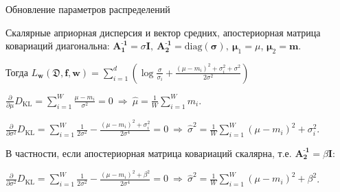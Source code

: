 \documentclass{beamer}
\newcommand{\DD}{{\mathfrak{D}}}
\newcommand{\bw}{{\textbf{w}}}
\newcommand{\II}{{\textbf{I}}}
\newcommand{\bbf}{{\textbf{f}}}
\newcommand{\bm}{{\textbf{m}}}
\newcommand{\bs}{{\boldsymbol{\sigma}}}
\newcommand{\bAo}{\mathbf{A^\text{-1}_\text{1}}}
\newcommand{\bAt}{\mathbf{A^\text{-1}_\text{2}}}
\newcommand{\bmuo}{{\boldsymbol{\mu}_1}}
\newcommand{\bmut}{{\boldsymbol{\mu}_2}}
\newcommand{\DKL}{\mathit{D}_{\text{KL}}}
\begin{document}
%
%
%
%
%
%
%

\begin{frame}{Обновление параметров распределений}

Скалярные априорная дисперсия и вектор средних, апостериорная матрица ковариаций диагональна: $\bAo = \sigma\II, \ \bAt = \text{diag}(\bs), \ \bmuo = \mu$, $\bmut = \bm$.

Тогда $L_\bw(\DD,\bbf,\bw) = \sum\limits_{i=1}^d(\log\frac{\sigma}{\sigma_i} + \frac{(\mu-m_i)^2 + \sigma_i^2 + \sigma^2}{2\sigma^2})$

$\frac\partial{\partial\mu}\DKL = \sum\limits_{i=1}^W\frac{\mu-m_i}{\sigma^2}=0 \ \Rightarrow \ \hat{\mu} = \frac1W\sum\limits_{i=1}^W m_i$.

$\frac\partial{\partial\sigma^2}\DKL = \sum\limits_{i=1}^W \frac1{2\sigma^2}-\frac{(\mu-m_i)^2 + \sigma_i^2}{2\sigma^4}=0 \ \Rightarrow \ \hat{\sigma}^2 = \frac1W\sum\limits_{i=1}^W (\mu-m_i)^2 + \sigma_i^2$.

В частности, если апостериорная матрица ковариаций скалярна, т.е. $\bAt = \beta \II$:


$\frac\partial{\partial\sigma^2}\DKL = \sum\limits_{i=1}^W \frac1{2\sigma^2}-\frac{(\mu-m_i)^2 + \beta^2}{2\sigma^4}=0 \ \Rightarrow \ \hat{\sigma}^2 = \frac1W\sum\limits_{i=1}^W (\mu-m_i)^2 + \beta^2$.

\end{frame}
\end{document}
